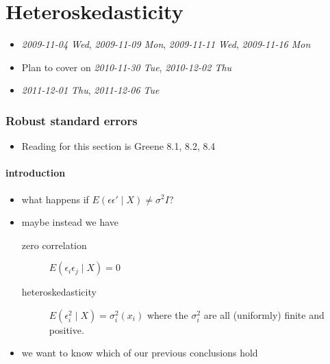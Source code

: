 
\part*{Heteroskedasticity}%

\begin{itemize}
\item \textit{2009-11-04 Wed}, \textit{2009-11-09 Mon},  \textit{2009-11-11 Wed}, \textit{2009-11-16 Mon}
\item Plan to cover on \textit{2010-11-30 Tue}, \textit{2010-12-02 Thu}
\item \textit{2011-12-01 Thu}, \textit{2011-12-06 Tue}
\end{itemize}
\section{Robust standard errors}
\label{sec-1}

\begin{itemize}
\item Reading for this section is Greene 8.1, 8.2, 8.4
\end{itemize}
\subsection{introduction}
\label{sec-1-1}

\begin{itemize}
\item what happens if $E(\epsilon \epsilon' \mid X) \neq \sigma^2 I$?
\item maybe instead we have
\begin{description}
\item[zero correlation] $E(\epsilon_i \epsilon_j \mid X) = 0$
\item[heteroskedasticity] $E(\epsilon_i^2 \mid X) =
            \sigma_i^2(x_i)$ where the $\sigma_i^2$ are all
            (uniformly) finite and positive.
\end{description}
\item we want to know which of our previous conclusions hold
\end{itemize}
